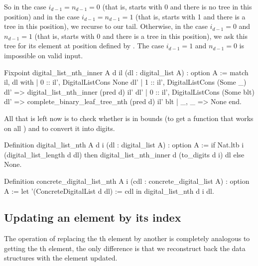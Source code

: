 \documentclass{article}
\begin{document}
So in the case $i_{d - 1} = n_{d - 1} = 0$ (that is,  starts with 0 and there is no tree in this position) and in the case $i_{d - 1} = n_{d - 1} = 1$ (that is,  starts with 1 and there is a tree in this position), we recurse to our tail. Otherwise, in the case $i_{d - 1} = 0$ and $n_{d - 1} = 1$ (that is,  starts with 0 and there is a tree in this position), we ask this tree for its element at position defined by . The case $i_{d - 1} = 1$ and $n_{d - 1} = 0$ is impossible on valid input. \pagebreak%

\begin{coq}
Fixpoint digital_list_nth_inner {A} d il (dl : digital_list A) : option A :=
  match il, dl with
  | 0 :: il', DigitalListCons None dl'
  | 1 :: il', DigitalListCons (Some _) dl' => digital_list_nth_inner (pred d) il' dl'
  | 0 :: il', DigitalListCons (Some blt) dl' => complete_binary_leaf_tree_nth (pred d) il' blt
  | _, _ => None
  end.
\end{coq}

All that is left now is to check whether  is in bounds (to get a function that works on all ) and to convert it into digits.

\begin{coq}
Definition digital_list_nth {A} d i (dl : digital_list A) : option A :=
  if Nat.ltb i (digital_list_length d dl)
  then digital_list_nth_inner d (to_digits d i) dl
  else None.

Definition concrete_digital_list_nth {A} i (cdl : concrete_digital_list A) : option A :=
  let '(ConcreteDigitalList d dl) := cdl in digital_list_nth d i dl.
\end{coq}

\subsection{Updating an element by its index}

The operation of replacing the th element by another  is completely analogous to getting the th element, the only difference is that we reconstruct back the data structures with the element updated.
\end{document}
